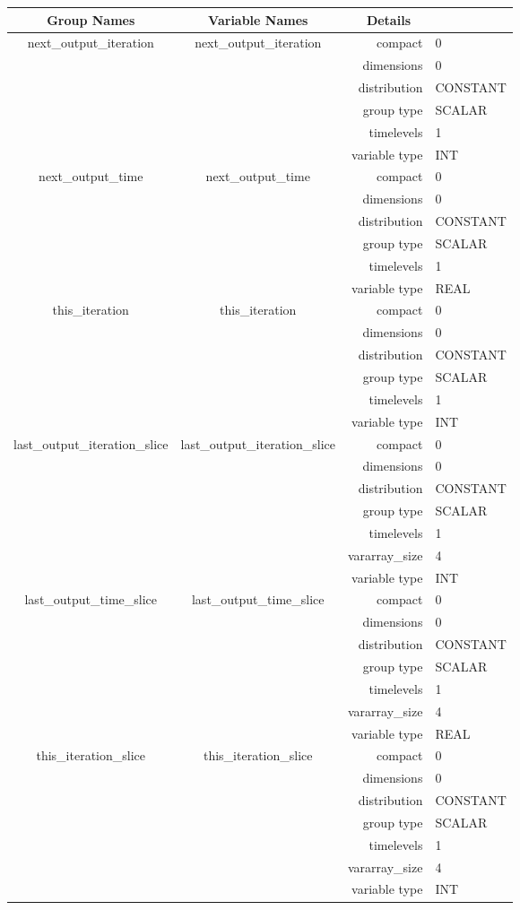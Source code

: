 \begin{tabular*}{150mm}{|c|c@{\extracolsep{\fill}}|rl|} \hline 
~ {\bf Group Names} ~ & ~ {\bf Variable Names} ~  &{\bf Details} ~ & ~\\ 
\hline 
next\_output\_iteration & next\_output\_iteration & compact & 0 \\ 
 &  & dimensions & 0 \\ 
 &  & distribution & CONSTANT \\ 
 &  & group type & SCALAR \\ 
 &  & timelevels & 1 \\ 
 &  & variable type & INT \\ 
\hline 
next\_output\_time & next\_output\_time & compact & 0 \\ 
 &  & dimensions & 0 \\ 
 &  & distribution & CONSTANT \\ 
 &  & group type & SCALAR \\ 
 &  & timelevels & 1 \\ 
 &  & variable type & REAL \\ 
\hline 
this\_iteration & this\_iteration & compact & 0 \\ 
 &  & dimensions & 0 \\ 
 &  & distribution & CONSTANT \\ 
 &  & group type & SCALAR \\ 
 &  & timelevels & 1 \\ 
 &  & variable type & INT \\ 
\hline 
last\_output\_iteration\_slice & last\_output\_iteration\_slice & compact & 0 \\ 
 &  & dimensions & 0 \\ 
 &  & distribution & CONSTANT \\ 
 &  & group type & SCALAR \\ 
 &  & timelevels & 1 \\ 
 &  & vararray\_size & 4 \\ 
 &  & variable type & INT \\ 
\hline 
last\_output\_time\_slice & last\_output\_time\_slice & compact & 0 \\ 
 &  & dimensions & 0 \\ 
 &  & distribution & CONSTANT \\ 
 &  & group type & SCALAR \\ 
 &  & timelevels & 1 \\ 
 &  & vararray\_size & 4 \\ 
 &  & variable type & REAL \\ 
\hline 
this\_iteration\_slice & this\_iteration\_slice & compact & 0 \\ 
 &  & dimensions & 0 \\ 
 &  & distribution & CONSTANT \\ 
 &  & group type & SCALAR \\ 
 &  & timelevels & 1 \\ 
 &  & vararray\_size & 4 \\ 
 &  & variable type & INT \\ 
\hline 
\end{tabular*} 



